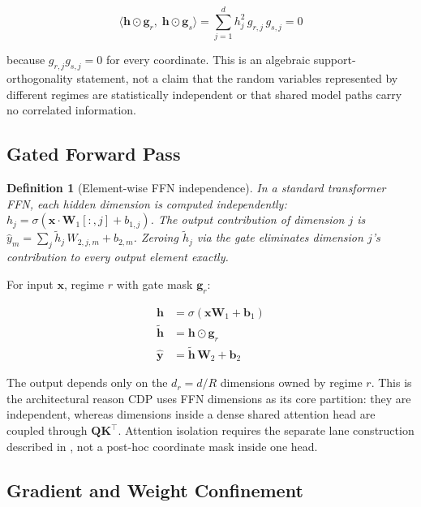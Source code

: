 \documentclass[11pt,a4paper]{article}
\newtheorem{definition}{Definition}
\newcommand{\bx}{\mathbf{x}}
\newcommand{\bh}{\mathbf{h}}
\newcommand{\bW}{\mathbf{W}}
\newcommand{\bQ}{\mathbf{Q}}
\newcommand{\bK}{\mathbf{K}}
\newcommand{\bg}{\mathbf{g}}
\begin{document}
\begin{equation}
\langle \bh \odot \bg_r, \; \bh \odot \bg_s \rangle
= \sum_{j=1}^{d} h_j^2 \, g_{r,j} \, g_{s,j}
= 0
\label{eq:entanglement-breaking}
\end{equation}

because $g_{r,j}g_{s,j}=0$ for every coordinate.  This is an
algebraic support-orthogonality statement, not a claim that the
random variables represented by different regimes are statistically
independent or that shared model paths carry no correlated
information.

\subsection{Gated Forward Pass}
\label{sec:gated-forward}

\begin{definition}[Element-wise FFN independence]
\label{def:ffn-independence}
In a standard transformer FFN, each hidden dimension is computed
independently: $h_j = \sigma(\bx \cdot \bW_1[:,j] + b_{1,j})$.
The output contribution of dimension $j$ is
$\hat{y}_m = \sum_j \tilde{h}_j \, W_{2,j,m} + b_{2,m}$.
Zeroing $\tilde{h}_j$ via the gate eliminates dimension $j$'s
contribution to every output element exactly.
\end{definition}

For input $\bx$, regime $r$ with gate mask $\bg_r$:

\begin{align}
    \bh &= \sigma(\bx \bW_1 + \mathbf{b}_1)
    \label{eq:ffn-hidden} \\
    \tilde{\bh} &= \bh \odot \bg_r
    \label{eq:gate-apply} \\
    \hat{\mathbf{y}} &= \tilde{\bh} \, \bW_2 + \mathbf{b}_2
    \label{eq:ffn-output}
\end{align}

The output depends only on the $d_r=d/R$ dimensions
owned by regime $r$.  This is the architectural reason CDP
uses FFN dimensions as its core partition: they are independent,
whereas dimensions inside a dense shared attention head are coupled
through $\bQ\bK^\top$.  Attention isolation requires the separate
lane construction described in , not a
post-hoc coordinate mask inside one head.

\subsection{Gradient and Weight Confinement}
\label{sec:gradient-isolation}
\end{document}

